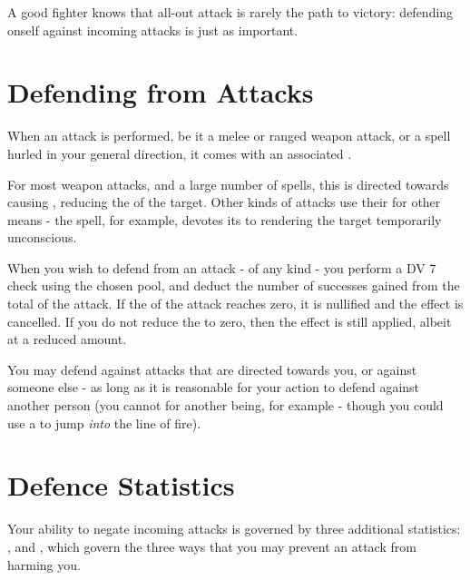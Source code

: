 
\label{S:Accuracy}\label{S:Defence}

A good fighter knows that all-out attack is rarely the path to victory: defending onself against incoming attacks is just as important. 

\section{Defending from Attacks}

When an attack is performed, be it a melee or ranged weapon attack, or a spell hurled in your general direction, it comes with an associated . 

For most weapon attacks, and a large number of spells, this  is directed towards causing , reducing the  of the target. Other kinds of attacks use their  for other means - the  spell, for example, devotes its  to rendering the target temporarily unconscious. 

When you wish to defend from an attack - of any kind - you perform a DV 7  check using the chosen pool, and deduct the number of successes gained from the total  of the attack. If the  of the attack reaches zero, it is nullified and the effect is cancelled. If you do not reduce the  to zero, then the effect is still applied, albeit at a reduced amount.  

You may defend against attacks that are directed towards you, or against someone else - as long as it is reasonable for your action to defend against another person (you cannot  for another being, for example - though you could use a  to jump {\it into} the line of fire).

\section{Defence Statistics}

Your ability to negate incoming attacks is governed by three additional statistics: ,  and , which govern the three ways that you may prevent an attack from harming you. 

\newcommand\defendRow[3]{\key{#1}	&	\imp{#2}	&	\parbox[t]{4.4 cm}{\raggedright #3} \\}
	
